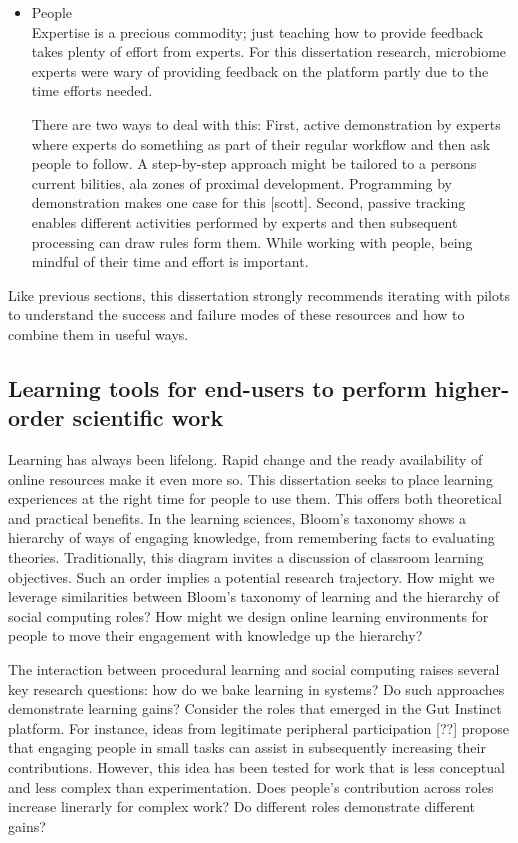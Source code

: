 \begin{itemize}
\item People \\
Expertise is a precious commodity; just teaching how to provide feedback takes plenty of effort from experts. For this dissertation research, microbiome experts were wary of providing feedback on the platform partly due to the time efforts needed. 

There are two ways to deal with this: First, active demonstration by experts where experts do something as part of their regular workflow and then ask people to follow. A step-by-step approach might be tailored to a person\textquotesingle s current bilities, ala zones of proximal development. Programming by demonstration makes one case for this [scott]. Second, passive tracking enables different activities performed by experts and then subsequent processing can draw rules form them. While working with people, being mindful of their time and effort is important.
\end{itemize}

Like previous sections, this dissertation strongly recommends iterating with pilots to understand the success and failure modes of these resources and how to combine them in useful ways.

\subsection{Learning tools for end-users to perform higher-order scientific work}
Learning has always been lifelong. Rapid change and the ready availability of online resources make it even more so. This dissertation seeks to place learning experiences at the right time for people to use them. This offers both theoretical and practical benefits. In the learning sciences, Bloom’s taxonomy shows a hierarchy of ways of engaging knowledge, from remembering facts to evaluating theories. Traditionally, this diagram invites a discussion of classroom learning objectives. Such an order implies a potential research trajectory. How might we leverage similarities between Bloom’s taxonomy of learning and the hierarchy of social computing roles? How might we design online learning environments for people to move their engagement with knowledge up the hierarchy? 

The interaction between procedural learning and social computing raises several key research questions: how do we bake learning in systems? Do such approaches demonstrate learning gains? Consider the roles that emerged in the Gut Instinct platform. For instance, ideas from legitimate peripheral participation [??] propose that engaging people in small tasks can assist in subsequently increasing their contributions. However, this idea has been tested for work that is less conceptual and less complex than experimentation. Does people's contribution across roles increase linerarly for complex work? Do different roles demonstrate different gains?

